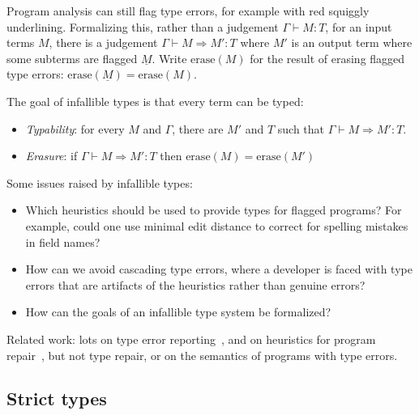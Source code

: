 \documentclass[acmsmall]{acmart}
\newcommand{\squnder}[1]{\underline{#1}}
\newcommand{\infer}[2]{\frac{\textstyle#1}{\textstyle#2}}
\newcommand{\erase}{\mathrm{erase}}
\begin{document}
Program analysis can still flag type errors, for example with red
squiggly underlining. Formalizing this, rather than a judgement
$\Gamma\vdash M:T$, for an input terms $M$, there is a judgement
$\Gamma \vdash M \Rightarrow M' : T$ where $M'$ is an output term
where some subterms are flagged $\squnder{M}$. Write $\erase(M)$
for the result of erasing flagged type errors: $\erase(\squnder{M}) = \erase(M)$.


The goal of infallible types is that every term can be typed:
\begin{itemize}
\item \emph{Typability}: for every $M$ and $\Gamma$,
  there are $M'$ and $T$ such that $\Gamma \vdash M \Rightarrow M' : T$.
\item \emph{Erasure}: if $\Gamma \vdash M \Rightarrow M' : T$
  then $\erase(M) = \erase(M')$ 
\end{itemize}
Some issues raised by infallible types:
\begin{itemize}
\item Which heuristics should be used to provide types for flagged programs? For example, could one
  use minimal edit distance to correct for spelling mistakes in field names?
\item How can we avoid cascading type errors, where a developer is
  faced with type errors that are artifacts of the heuristics rather
  than genuine errors?
\item How can the goals of an infallible type system be formalized?
\end{itemize}
Related work: lots on type error reporting~\cite{???}, and on
heuristics for program repair~\cite{???}, but not type repair, or on
the semantics of programs with type errors.

\subsection{Strict types}
\end{document}
